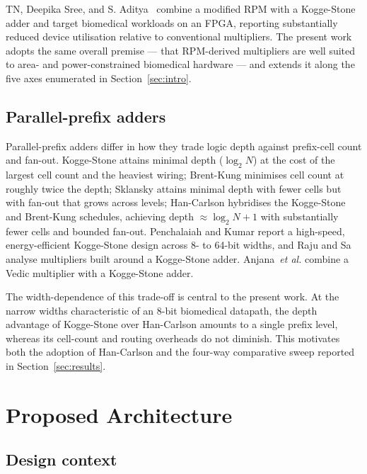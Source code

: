 \documentclass[conference]{IEEEtran}
\begin{document}
TN, Deepika Sree, and S. Aditya~\cite{base} combine a modified RPM with a
Kogge-Stone adder and target biomedical workloads on an FPGA, reporting
substantially reduced device utilisation relative to conventional
multipliers. The present work adopts the same overall premise
--- that RPM-derived multipliers are well suited to area- and
power-constrained biomedical hardware --- and extends it along the five
axes enumerated in Section~\ref{sec:intro}.

\subsection{Parallel-prefix adders}

Parallel-prefix adders differ in how they trade logic depth against
prefix-cell count and fan-out. Kogge-Stone attains minimal depth
($\log_2 N$) at the cost of the largest cell count and the heaviest
wiring; Brent-Kung minimises cell count at roughly twice the depth;
Sklansky attains minimal depth with fewer cells but with fan-out that
grows across levels; Han-Carlson hybridises the Kogge-Stone and
Brent-Kung schedules, achieving depth $\approx \log_2 N + 1$ with
substantially fewer cells and bounded fan-out. Penchalaiah and Kumar
\cite{penchalaiah} report a high-speed, energy-efficient Kogge-Stone
design across 8- to 64-bit widths, and Raju and Sa \cite{raju} analyse
multipliers built around a Kogge-Stone adder. Anjana~\textit{et al.}
\cite{anjana} combine a Vedic multiplier with a Kogge-Stone adder.

The width-dependence of this trade-off is central to the present work.
At the narrow widths characteristic of an 8-bit biomedical datapath,
the depth advantage of Kogge-Stone over Han-Carlson amounts to a single
prefix level, whereas its cell-count and routing overheads do not
diminish. This motivates both the adoption of Han-Carlson and the
four-way comparative sweep reported in Section~\ref{sec:results}.

\section{Proposed Architecture}
\label{sec:arch}

\subsection{Design context}
\end{document}
